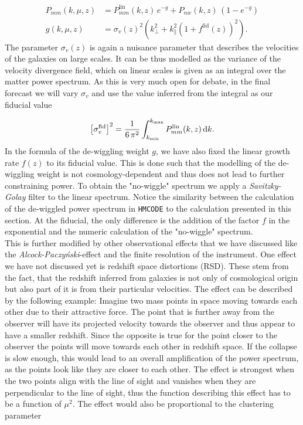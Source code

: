 \documentclass[../main.tex]{subfiles}
\begin{document}
\begin{align}
    P_{mm}(k,\mu,z) &= P_{mm}^\mathrm{lin}(k,z)\,e^{-g} + P_{nw}(k,z)\,\left(1-e^{-g} \right)\\
    g(k,\mu,z) &= \sigma_v(z)^2 \left(k_\perp^2+k_\|^2\left(1+f^\mathrm{fid}(z)\right)^2 \right).
\end{align}
The parameter $\sigma_v(z)$ is again a nuisance parameter that describes the velocities of the galaxies on large scales. It can be thus modelled as the variance of the velocity divergence field, which on linear scales is given as an integral over the matter power spectrum. As this is very much open for debate, in the final forecast we will vary $\sigma_v$ and use the value inferred from the integral as our fiducial value  

\begin{equation}
    \left[\sigma_v^\mathrm{fid}\right]^2 = \frac{1}{6\,\pi^2} \int_{k_\mathrm{min}}^{k_\mathrm{max}} P^{\mathrm{lin}}_{mm}(k,z)\, \mathrm{d} k.
\end{equation} 
In the formula of the de-wiggling weight $g$, we have also fixed the linear growth rate $f(z)$ to its fiducial value. This is done such that the modelling of the de-wiggling weight is not cosmology-dependent and thus does not lead to further constraining power. To obtain the "no-wiggle" spectrum we apply a \textit{Savitzky-
Golay} filter to the linear spectrum. Notice the similarity between the calculation of the de-wiggled power spectrum in {\tt HMCODE} to the calculation presented in this section. At the fiducial, the only difference is the addition of the factor $f$ in the exponential and the numeric calculation of the "no-wiggle" spectrum.\\ 
This is further modified by other observational effects that we have discussed like the \textit{Alcock-Paczyński}-effect and the finite resolution of the instrument. One effect we have not discussed yet is redshift space distortions (RSD). These stem from the fact, that the redshift inferred from galaxies is not only of cosmological origin but also part of it is from their particular velocities. The effect can be described by the following example: Imagine two mass points in space moving towards each other due to their attractive force. The point that is further away from the observer will have its projected velocity towards the observer and thus appear to have a smaller redshift. Since the opposite is true for the point closer to the observer the points will move towards each other in redshift space. If the collapse is slow enough, this would lead to an overall amplification of the power spectrum, as the points look like they are closer to each other. The effect is strongest when the two points align with the line of sight and vanishes when they are perpendicular to the line of sight, thus the function describing this effect has to be a function of $\mu^2$. The effect would also be proportional to the clustering parameter
\end{document}

